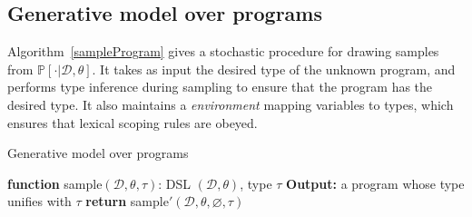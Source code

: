 \documentclass{article}
\newcommand{\probability}{\mathds{P}} %
\begin{document}
\subsection{Generative model over programs}\label{generativeAppendix}
Algorithm~\ref{sampleProgram} gives a stochastic procedure for drawing samples from $\probability[\cdot |\mathcal{D},\theta]$.
It takes as input the desired type of the unknown program,
and performs type inference during
sampling to ensure that
the program has the desired type.
It also maintains a \emph{environment}
mapping variables to types,
which ensures
that lexical scoping rules are obeyed.
\begin{algorithm}
  \caption{Generative model over programs}
  \label{sampleProgram}
  \begin{algorithmic}[1]
    \State \textbf{function} sample$(\mathcal{D}, \theta, \tau)$:
     DSL $(\mathcal{D},\theta)$, type $\tau$
    \State \textbf{Output:} a program whose type unifies with $\tau$
    \State  \textbf{return }sample$'(\mathcal{D}, \theta, \varnothing, \tau)$


\end{algorithmic}
\end{algorithm}
\end{document}
